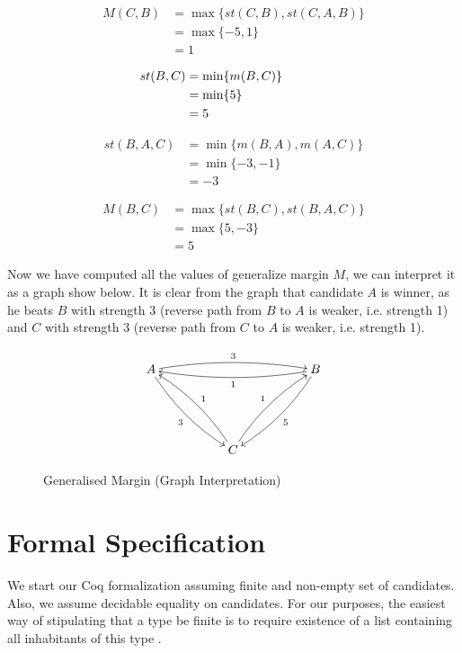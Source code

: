\begin{align}
M (C, B)&=  \max \lbrace st (C, B), st(C, A, B) \rbrace \nonumber \\
                     &= \max \lbrace -5, 1 \rbrace \nonumber \\
                     &= 1\nonumber
\end{align}


\begin{align}
\hspace{-3cm} st (B, C)&=  \min \lbrace m (B, C) \rbrace  \nonumber \\
					  &= \min \lbrace 5 \rbrace  \nonumber \\
                     &= 5 \nonumber
\end{align}


\begin{align}
st (B, A, C)&= \min \lbrace m (B, A), m (A, C) \rbrace  \nonumber \\
                     &= \min \lbrace -3, -1\rbrace \nonumber \\
                     &= -3\nonumber
\end{align}

\begin{align}
M (B, C)&=  \max \lbrace st (B, C), st(B, A, C) \rbrace \nonumber \\
                     &= \max \lbrace 5, -3 \rbrace \nonumber \\
                     &= 5\nonumber
\end{align}

\noindent
Now we have computed all the values of generalize margin $M$, we can interpret it as a
graph show below.  It is clear from the graph that candidate $A$ is winner, as he beats 
$B$ with strength 3 (reverse path from $B$ to $A$ is weaker, i.e. strength 1) and 
$C$ with strength 3 (reverse path from $C$ to $A$ is weaker, i.e. strength 1). 

\begin{figure}[h] 
\[
 \xymatrix@R=12ex@C=12ex{
A \ar@/^/[rr]^{3} \ar@/_/[dr]_{3} & & B \ar@/^/[ll]^{1}
\ar@/^/[dl]^5 \\
& C \ar@/_/[ul]_{1} \ar@/^/[ur]^{1}
}\]
\caption{Generalised Margin (Graph Interpretation)}\label{generalizemargin}
\end{figure}
	 
	
	
\section{Formal Specification} \label{sec:spec}
	We start our Coq formalization assuming finite  and non-empty 
	set of candidates. Also, we assume decidable equality on 
	candidates. For our purposes, the
	easiest way of stipulating that a type be finite is to require
	existence of a list containing all inhabitants of this type \citep{DBLP:conf/icfp/FirsovU15}.

